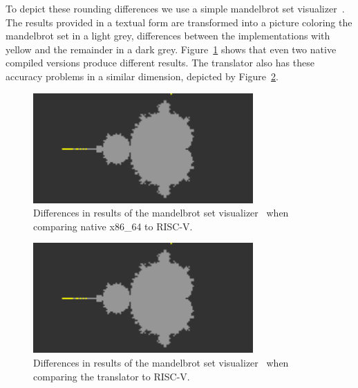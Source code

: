 \documentclass[course=eragp]{aspdoc}
\begin{document}
\par

To depict these rounding differences we use a simple mandelbrot set
visualizer~\cite{mandelbrot_program}. The results provided in a textual form are transformed into a
picture coloring the mandelbrot set in a light grey, differences between the implementations with
yellow and the remainder in a dark grey. Figure~\ref{fig:mandelbrot_diff_native_x86} shows that even
two native compiled versions produce different results. The translator also has these accuracy
problems in a similar dimension, depicted by Figure~\ref{fig:mandelbrot_diff_translator}.

\par

\begin{figure}[ht]
    \centering
    \includegraphics[width=0.75\textwidth]{images/mandelbrot_differences/x86_diff.png}
    \caption{Differences in results of the mandelbrot set visualizer~\cite{mandelbrot_program} when
        comparing native x86\_64 to RISC-V.}\label{fig:mandelbrot_diff_native_x86}
\end{figure}

\begin{figure}[ht]
    \centering
    \includegraphics[width=0.75\textwidth]{images/mandelbrot_differences/translated_diff.png}
    \caption{Differences in results of the mandelbrot set visualizer~\cite{mandelbrot_program} when
        comparing the translator to RISC-V.}\label{fig:mandelbrot_diff_translator}
\end{figure}
\end{document}
